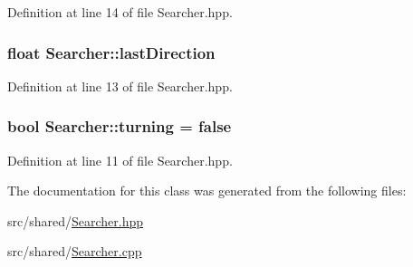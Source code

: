 Definition at line 14 of file Searcher.\-hpp.

\hypertarget{classSearcher_af6082983203ee203e741b79737c205d6}{
\subsubsection[{last\-Direction}]{\setlength{\rightskip}{0pt plus 5cm}float Searcher\-::last\-Direction\hspace{0.3cm}{\ttfamily [private]}}}\label{classSearcher_af6082983203ee203e741b79737c205d6}


Definition at line 13 of file Searcher.\-hpp.

\hypertarget{classSearcher_aa1764fe370476e6bf19b30e5a8c2b073}{
\subsubsection[{turning}]{\setlength{\rightskip}{0pt plus 5cm}bool Searcher\-::turning = false\hspace{0.3cm}{\ttfamily [private]}}}\label{classSearcher_aa1764fe370476e6bf19b30e5a8c2b073}


Definition at line 11 of file Searcher.\-hpp.



The documentation for this class was generated from the following files\-:\begin{DoxyCompactItemize}
\item 
src/shared/\hyperlink{Searcher_8hpp}{Searcher.\-hpp}\item 
src/shared/\hyperlink{Searcher_8cpp}{Searcher.\-cpp}\end{DoxyCompactItemize}
